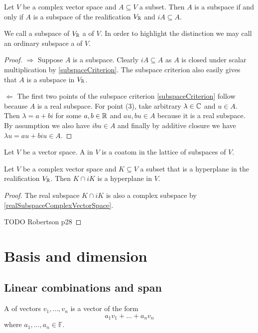 \begin{lemma} \label{realSubspaceComplexVectorSpace}
Let $V$ be a complex vector space and $A\subseteq V$ a subset. Then $A$ is a subspace \textup{if and only if} $A$ is a subspace of the realification $V_{\mathbb{R}}$ and $iA \subseteq A$.
\end{lemma}
We call a subspace of $V_{\mathbb{R}}$ a  of $V$. In order to highlight the distinction we may call an ordinary subspace a  of $V$.
\begin{proof}
$\boxed{\Rightarrow}$ Suppose $A$ is a subspace. Clearly $iA \subseteq A$ as $A$ is closed under scalar multiplication by \ref{subspaceCriterion}. The subspace criterion also easily gives that $A$ is a subspace in $V_{\mathbb{R}}$.

$\boxed{\Leftarrow}$ The first two points of the subspace criterion \ref{subspaceCriterion} follow because $A$ is a real subspace. For point (3), take arbitrary $\lambda \in \mathbb{C}$ and $u\in A$. Then $\lambda = a+bi$ for some $a,b\in \mathbb{R}$ and $au,bu\in A$ because it is a real subspace. By assumption we also have $ibu\in A$ and finally by additive closure we have $\lambda u = au+biu \in A$.
\end{proof}

\begin{definition}
Let $V$ be a vector space. A  in $V$ is a coatom in the lattice of subspaces of $V$.
\end{definition}

\begin{lemma} \label{realComplexHyperplane}
Let $V$ be a complex vector space and $K \subseteq V$ a subset that is a hyperplane in the realification $V_{\mathbb{R}}$. Then $K\cap iK$ is a hyperplane in $V$.
\end{lemma}
\begin{proof}
The real subspace $K\cap iK$ is also a complex subspace by \ref{realSubspaceComplexVectorSpace}.

TODO Robertson p28
\end{proof}

\section{Basis and dimension}
\subsection{Linear combinations and span}
\begin{definition}
A  of vectors $v_1, \ldots, v_n$ is a vector of the form
\[ a_1v_1 + \ldots + a_nv_n \]
where $a_1, \ldots, a_n \in \mathbb{F}$.
\end{definition}

